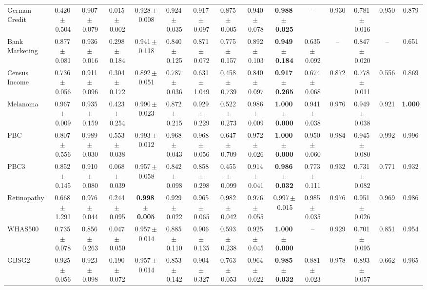 \documentclass[8pt]{extarticle}
\begin{document}
\begin{longtable}{l*{14}{c}}
German Credit & 0.420\,$\pm$\,0.504 & 0.907\,$\pm$\,0.079 & 0.015\,$\pm$\,0.002 & 0.928\,$\pm$\,0.008 & 0.924\,$\pm$\,0.035 & 0.917\,$\pm$\,0.097 & 0.875\,$\pm$\,0.005 & 0.940\,$\pm$\,0.078 & \textbf{0.988\,$\pm$\,0.025} & -- & 0.930 & 0.781\,$\pm$\,0.016 & 0.950 & 0.879 \\
Bank Marketing & 0.877\,$\pm$\,0.081 & 0.936\,$\pm$\,0.016 & 0.298\,$\pm$\,0.184 & 0.941\,$\pm$\,0.118 & 0.840\,$\pm$\,0.125 & 0.871\,$\pm$\,0.072 & 0.775\,$\pm$\,0.157 & 0.892\,$\pm$\,0.103 & \textbf{0.949\,$\pm$\,0.184} & 0.635\,$\pm$\,0.092 & -- & 0.847\,$\pm$\,0.020 & -- & 0.651 \\
Census Income & 0.736\,$\pm$\,0.056 & 0.911\,$\pm$\,0.096 & 0.304\,$\pm$\,0.172 & 0.892\,$\pm$\,0.051 & 0.787\,$\pm$\,0.036 & 0.631\,$\pm$\,1.049 & 0.458\,$\pm$\,0.739 & 0.840\,$\pm$\,0.097 & \textbf{0.917\,$\pm$\,0.265} & 0.674\,$\pm$\,0.068 & 0.872 & 0.778\,$\pm$\,0.011 & 0.556 & 0.869 \\
Melanoma & 0.967\,$\pm$\,0.009 & 0.935\,$\pm$\,0.159 & 0.423\,$\pm$\,0.254 & 0.990\,$\pm$\,0.023 & 0.872\,$\pm$\,0.215 & 0.929\,$\pm$\,0.229 & 0.522\,$\pm$\,0.273 & 0.986\,$\pm$\,0.009 & \textbf{1.000\,$\pm$\,0.000} & 0.941\,$\pm$\,0.038 & 0.976 & 0.949\,$\pm$\,0.038 & 0.921 & \textbf{1.000} \\
PBC & 0.807\,$\pm$\,0.556 & 0.989\,$\pm$\,0.030 & 0.553\,$\pm$\,0.038 & 0.993\,$\pm$\,0.012 & 0.968\,$\pm$\,0.043 & 0.968\,$\pm$\,0.056 & 0.647\,$\pm$\,0.709 & 0.972\,$\pm$\,0.026 & \textbf{1.000\,$\pm$\,0.000} & 0.950\,$\pm$\,0.060 & 0.984 & 0.945\,$\pm$\,0.080 & 0.992 & 0.996 \\
PBC3 & 0.852\,$\pm$\,0.145 & 0.910\,$\pm$\,0.080 & 0.068\,$\pm$\,0.039 & 0.957\,$\pm$\,0.058 & 0.842\,$\pm$\,0.098 & 0.858\,$\pm$\,0.298 & 0.455\,$\pm$\,0.099 & 0.914\,$\pm$\,0.041 & \textbf{0.986\,$\pm$\,0.032} & 0.773\,$\pm$\,0.111 & 0.932 & 0.731\,$\pm$\,0.082 & 0.771 & 0.932 \\
Retinopathy & 0.668\,$\pm$\,1.291 & 0.976\,$\pm$\,0.044 & 0.244\,$\pm$\,0.095 & \textbf{0.998\,$\pm$\,0.005} & 0.929\,$\pm$\,0.022 & 0.965\,$\pm$\,0.065 & 0.982\,$\pm$\,0.042 & 0.976\,$\pm$\,0.055 & 0.997\,$\pm$\,0.015 & 0.985\,$\pm$\,0.035 & 0.976 & 0.951\,$\pm$\,0.026 & 0.969 & 0.986 \\
WHAS500 & 0.735\,$\pm$\,0.078 & 0.856\,$\pm$\,0.263 & 0.047\,$\pm$\,0.050 & 0.957\,$\pm$\,0.014 & 0.885\,$\pm$\,0.110 & 0.906\,$\pm$\,0.135 & 0.593\,$\pm$\,0.238 & 0.925\,$\pm$\,0.045 & \textbf{1.000\,$\pm$\,0.000} & -- & 0.929 & 0.701\,$\pm$\,0.095 & 0.851 & 0.954 \\
GBSG2 & 0.925\,$\pm$\,0.056 & 0.923\,$\pm$\,0.098 & 0.190\,$\pm$\,0.072 & 0.957\,$\pm$\,0.014 & 0.853\,$\pm$\,0.142 & 0.904\,$\pm$\,0.327 & 0.763\,$\pm$\,0.053 & 0.964\,$\pm$\,0.022 & \textbf{0.985\,$\pm$\,0.032} & 0.881\,$\pm$\,0.023 & 0.978 & 0.893\,$\pm$\,0.057 & 0.662 & 0.965 \\

\end{longtable}
\end{document}
